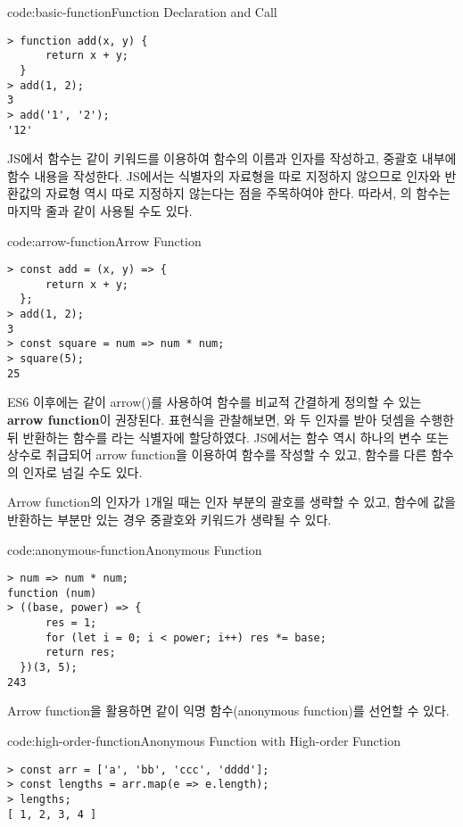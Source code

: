 \begin{codeenv}{code:basic-function}{Function Declaration and Call}\begin{verbatim}
> function add(x, y) {
      return x + y;
  }
> add(1, 2);
3
> add('1', '2');
'12'
\end{verbatim}
\end{codeenv}

JS에서 함수는 \과 같이  키워드를 이용하여 함수의 이름과 인자를 작성하고, 중괄호 내부에 함수 내용을 작성한다. JS에서는 식별자의 자료형을 따로 지정하지 않으므로 인자와 반환값의 자료형 역시 따로 지정하지 않는다는 점을 주목하여야 한다. 따라서, 의 함수는 마지막 줄과 같이 사용될 수도 있다.

\begin{codeenv}{code:arrow-function}{Arrow Function}\begin{verbatim}
> const add = (x, y) => {
      return x + y;
  };
> add(1, 2);
3
> const square = num => num * num;
> square(5);
25
\end{verbatim}
\end{codeenv}

ES6 이후에는 \과 같이 arrow(\cd{=>})를 사용하여 함수를 비교적 간결하게 정의할 수 있는 \textbf{arrow function}이 권장된다. 표현식을 관찰해보면, 와  두 인자를 받아 덧셈을 수행한 뒤 반환하는 함수를 라는 식별자에 할당하였다. JS에서는 함수 역시 하나의 변수 또는 상수로 취급되어 arrow function을 이용하여 함수를 작성할 수 있고, 함수를 다른 함수의 인자로 넘길 수도 있다.

Arrow function의 인자가 1개일 때는 인자 부분의 괄호를 생략할 수 있고, 함수에 값을 반환하는 부분만 있는 경우 중괄호와  키워드가 생략될 수 있다.

\begin{codeenv}{code:anonymous-function}{Anonymous Function}\begin{verbatim}
> num => num * num;
function (num)
> ((base, power) => {
      res = 1;
      for (let i = 0; i < power; i++) res *= base;
      return res;
  })(3, 5);
243
\end{verbatim}
\end{codeenv}

Arrow function을 활용하면 \과 같이 익명 함수(anonymous function)를 선언할 수 있다.

\begin{codeenv}{code:high-order-function}{Anonymous Function with High-order Function}\begin{verbatim}
> const arr = ['a', 'bb', 'ccc', 'dddd'];
> const lengths = arr.map(e => e.length);
> lengths;
[ 1, 2, 3, 4 ]
\end{verbatim}
\end{codeenv}

